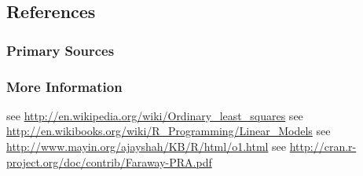 



\subsection{References}

\subsubsection{Primary Sources}



\subsubsection{More Information}

see \url{http://en.wikipedia.org/wiki/Ordinary_least_squares}
see \url{http://en.wikibooks.org/wiki/R_Programming/Linear_Models}
see \url{http://www.mayin.org/ajayshah/KB/R/html/o1.html}
see \url{http://cran.r-project.org/doc/contrib/Faraway-PRA.pdf}


